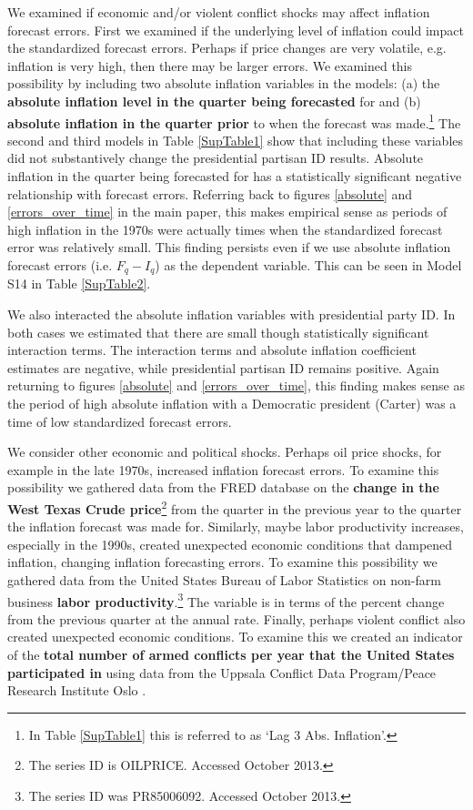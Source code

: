 \documentclass[a4paper]{article}\usepackage[]{graphicx}\usepackage[]{color}
\begin{document}
We examined if economic and/or violent conflict shocks may affect inflation forecast errors. First we examined if the underlying level of inflation could impact the standardized forecast errors. Perhaps if price changes are very volatile, e.g. inflation is very high, then there may be larger errors. We examined this possibility by including two absolute inflation variables in the models: (a) the \textbf{absolute inflation level in the quarter being forecasted} for and (b) \textbf{absolute inflation in the quarter prior} to when the forecast was made.\footnote{In Table \ref{SupTable1} this is referred to as `Lag 3 Abs. Inflation'.} The second and third models in Table \ref{SupTable1} show that including these variables did not substantively change the presidential partisan ID results. Absolute inflation in the quarter being forecasted for has a statistically significant negative relationship with forecast errors. Referring back to figures \ref{absolute} and \ref{errors_over_time} in the main paper, this makes empirical sense as periods of high inflation in the 1970s were actually times when the standardized forecast error was relatively small. This finding persists even if we use absolute inflation forecast errors (i.e. $F_{q} - I_{q}$) as the dependent variable. This can be seen in Model S14 in Table \ref{SupTable2}.

We also interacted the absolute inflation variables with presidential party ID. In both cases we estimated that there are small though statistically significant interaction terms. The interaction terms and absolute inflation coefficient estimates are negative, while presidential partisan ID remains positive. Again returning to figures \ref{absolute} and \ref{errors_over_time}, this finding makes sense as the period of high absolute inflation with a Democratic president (Carter) was a time of low standardized forecast errors.

We consider other economic and political shocks. Perhaps oil price shocks, for example in the late 1970s, increased inflation forecast errors. To examine this possibility we gathered data from the FRED database on the \textbf{change in the West Texas Crude price}\footnote{The series ID is OILPRICE. Accessed October 2013.} from the quarter in the previous year to the quarter the inflation forecast was made for. Similarly, maybe labor productivity increases, especially in the 1990s, created unexpected economic conditions that dampened inflation, changing inflation forecasting errors. To examine this possibility we gathered data from the United States Bureau of Labor Statistics on non-farm business \textbf{labor productivity}.\footnote{The series ID was PR85006092. Accessed October 2013.} The variable is in terms of the percent change from the previous quarter at the annual rate. Finally, perhaps violent conflict also created unexpected economic conditions. To examine this we created an indicator of the \textbf{total number of armed conflicts per year that the United States participated in} using data from the Uppsala Conflict Data Program/Peace Research Institute Oslo \citep{Harbom2008,Themner2013}. 
\end{document}
